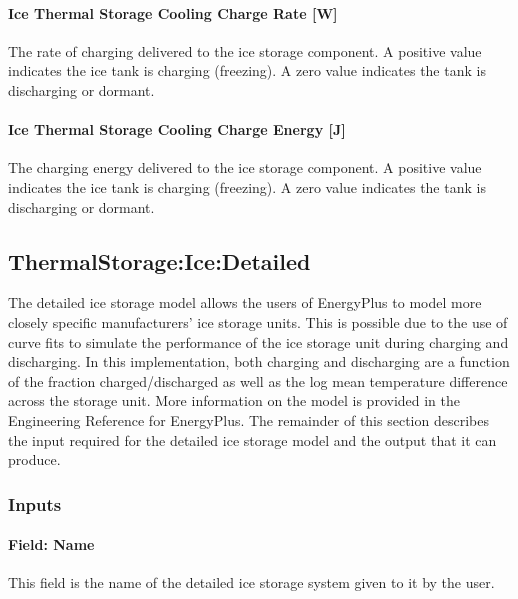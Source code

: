 \paragraph{Ice Thermal Storage Cooling Charge Rate {[}W{]}}\label{ice-thermal-storage-cooling-charge-rate-w}

The rate of charging delivered to the ice storage component. A positive value indicates the ice tank is charging (freezing). A zero value indicates the tank is discharging or dormant.

\paragraph{Ice Thermal Storage Cooling Charge Energy {[}J{]}}\label{ice-thermal-storage-cooling-charge-energy-j}

The charging energy delivered to the ice storage component. A positive value indicates the ice tank is charging (freezing). A zero value indicates the tank is discharging or dormant.

\subsection{ThermalStorage:Ice:Detailed}\label{thermalstorageicedetailed}

The detailed ice storage model allows the users of EnergyPlus to model more closely specific manufacturers' ice storage units. This is possible due to the use of curve fits to simulate the performance of the ice storage unit during charging and discharging. In this implementation, both charging and discharging are a function of the fraction charged/discharged as well as the log mean temperature difference across the storage unit. More information on the model is provided in the Engineering Reference for EnergyPlus. The remainder of this section describes the input required for the detailed ice storage model and the output that it can produce.

\subsubsection{Inputs}\label{inputs-21-004}

\paragraph{Field: Name}\label{field-name-21-001}

This field is the name of the detailed ice storage system given to it by the user.

